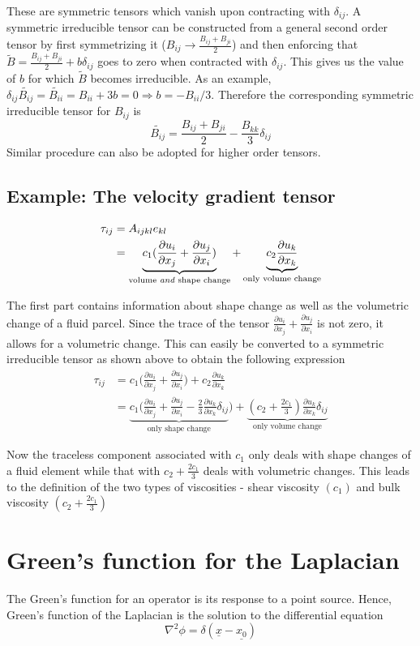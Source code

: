 \documentclass[11pt, letterpaper]{article}
\newcommand{\dl}{\delta}
\newcommand{\dij}{\delta_{ij}}
\newcommand{\1}{\bm{1}}
\newcommand{\pd}[2]{\frac{\partial #1}{\partial #2}}
\newcommand{\un}[1]{\underline{#1}}
\begin{document}
These are symmetric tensors which vanish upon contracting with $\dij$. A symmetric irreducible tensor can be constructed from a general second order tensor by first symmetrizing it ($B_{ij}\rightarrow\frac{B_{ij}+B_{ji}}{2}$) and then enforcing that $\widetilde{B} =\frac{B_{ij}+B_{ji}}{2} + b \dij$ goes to zero when contracted with $\dij$. This gives us the value of $b$ for which $\widetilde{B}$ becomes irreducible. As an example, $\dij \widetilde{B_{ij}} = \widetilde{B_{ii}} = B_{ii} + 3b = 0 \Rightarrow b= -B_{ii}/3$. Therefore the corresponding symmetric irreducible tensor for $B_{ij}$ is
$$
\widetilde{B_{ij}} = \frac{B_{ij}+B_{ji}}{2} - \frac{B_{kk}}{3}\dij
$$
Similar procedure can also be adopted for higher order tensors.

\subsection{Example: The velocity gradient tensor}
\begin{align*}
\tau_{ij} &= A_{ijkl}e_{kl}\\
 &= \underbrace{c_1(\pd{u_i}{x_j}+\pd{u_j}{x_i})}_{\text{volume \textit{and} shape change}} + \underbrace{c_2\pd{u_k}{x_k}}_{\text{only volume change}}
\end{align*}

The first part contains information about shape change as well as the volumetric change of a fluid parcel. Since the trace of the tensor $\pd{u_i}{x_j}+\pd{u_j}{x_i}$ is not zero, it allows for a volumetric change. This can easily be converted to a symmetric irreducible tensor as shown above to obtain the following expression
\begin{align*}
\tau_{ij} &= c_1\bigg(\pd{u_i}{x_j}+\pd{u_j}{x_i}\bigg) +c_2\pd{u_k}{x_k} \\
&=\underbrace{c_1\bigg(\pd{u_i}{x_j}+\pd{u_j}{x_i} - \frac{2}{3}\pd{u_k}{x_k}\dl_{ij}}_{\text{only shape change}}\bigg) + \underbrace{(c_2+\frac{2 c_1}{3})\pd{u_k}{x_k}\dij}_{\text{only volume change}}
\end{align*}

Now the traceless component associated with $c_1$ only deals with shape changes of a fluid element while that with $c_2+\frac{2 c_1}{3}$ deals with volumetric changes. This leads to the definition of the two types of viscosities - shear viscosity $(c_1)$ and bulk viscosity $(c_2+\frac{2 c_1}{3})$

\section{Green's function for the Laplacian}
The Green's function for an operator is its response to a point source. Hence, Green's function of the Laplacian is the solution to the differential equation
$$
\nabla ^2\phi = \delta(\un{x}-\un{x_0})
$$
\end{document}
